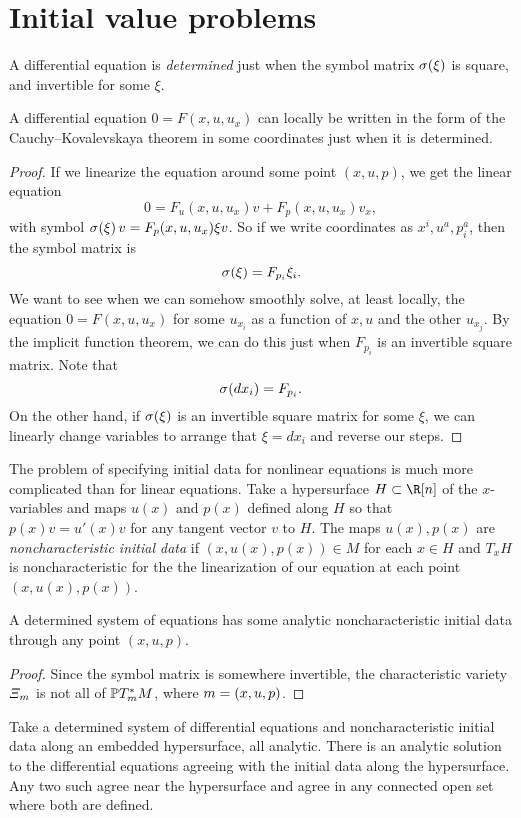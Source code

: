\section{Initial value problems}
A differential equation is \emph{determined} just when the symbol matrix \(\opsymbol[]{\xi}\) is square, and invertible for some \(\xi\).
\begin{lemma}
A differential equation \(0=F(x,u,u_x)\) can locally be written in the form of the Cauchy--Kovalevskaya theorem in some coordinates just when it is determined.
\end{lemma}
\begin{proof}
If we linearize the equation around some point \((x,u,p)\), we get the linear equation
\[
0=F_u(x,u,u_x)v + F_p(x,u,u_x)v_x,
\]
with symbol \(\opsymbol[]{\xi}v=F_p(x,u,u_x)\xi v\).
So if we write coordinates as \(x^i,u^a,p^a_i\), then the symbol matrix is 
\[
\opsymbol[]{\xi}=F_{p_i}\xi_i.
\]
We want to see when we can somehow smoothly solve, at least locally, the equation \(0=F(x,u,u_x)\) for some \(u_{x_i}\) as a function of \(x,u\) and the other \(u_{x_j}\).
By the implicit function theorem, we can do this just when \(F_{p_i}\) is an invertible square matrix.
Note that
\[
\opsymbol[]{dx_i}=F_{p_i}.
\]
On the other hand, if \(\opsymbol[]{\xi}\) is an invertible square matrix for some \(\xi\), we can linearly change variables to arrange that \(\xi=dx_i\) and reverse our steps.
\end{proof}
The problem of specifying initial data for nonlinear equations is much more complicated than for linear equations.
Take a hypersurface \(H \subset \R[n]\) of the \(x\)-variables and maps \(u(x)\) and \(p(x)\) defined along \(H\) so that \(p(x)v=u'(x)v\) for any tangent vector \(v\) to \(H\).
The maps \(u(x),p(x)\) are \emph{noncharacteristic initial data} if \((x,u(x),p(x)) \in M\) for each \(x \in H\) and \(T_x H\) is noncharacteristic for the the linearization of our equation at each point \((x,u(x),p(x))\).
\begin{lemma}
A determined system of equations has some analytic noncharacteristic initial data through any point \((x,u,p)\).
\end{lemma}
\begin{proof}
Since the symbol matrix is somewhere invertible, the characteristic variety \(\charvariety{m}\) is not all of \(\Proj(T_m^*M)\), where \(m=\left(x,u,p\right)\).
\end{proof}
\begin{theorem}\label{theorem:determined}
Take a determined system of differential equations and noncharacteristic initial data along an embedded hypersurface, all analytic.
There is an analytic solution to the differential equations agreeing with the initial data along the hypersurface.
Any two such agree near the hypersurface and agree in any connected open set where both are defined.
\end{theorem}

